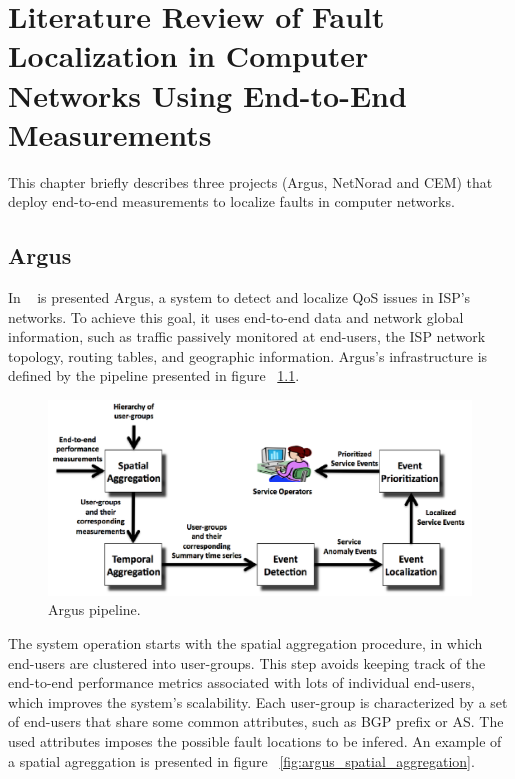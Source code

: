 \chapter{Literature Review of Fault Localization in Computer Networks Using
End-to-End Measurements}

This chapter briefly describes three projects (Argus, NetNorad and CEM)
that deploy end-to-end measurements to localize faults in computer networks.

\section{Argus}

In
~\cite{argus_end_to_end_service_anomaly_detection_and_localization_from_an_isps_point_of_view}
is presented Argus, a system to
detect and localize QoS issues in ISP's networks. To achieve this goal, it uses
end-to-end data and network global information, such as
traffic passively monitored at end-users, the ISP network topology,
routing tables, and geographic information. Argus's infrastructure is defined by
the pipeline presented in figure ~\ref{fig:argus_pipeline}.

\begin{figure}[H]
    \centering
    \includegraphics[width=1.0\textwidth]{./figures/literature_review/argus_pipeline.png}
    \caption{Argus pipeline.}
    \label{fig:argus_pipeline}
\end{figure}%

The system operation starts with the spatial aggregation procedure, in which
end-users are clustered into user-groups. This step avoids keeping
track of the end-to-end performance metrics associated with lots of
individual end-users, which improves the system's scalability.
Each user-group is characterized by a set of end-users that share some common
attributes, such as BGP prefix or AS. The used attributes imposes the possible
fault locations to be infered.
An example of a spatial agreggation is presented in figure
~\ref{fig:argus_spatial_aggregation}.

